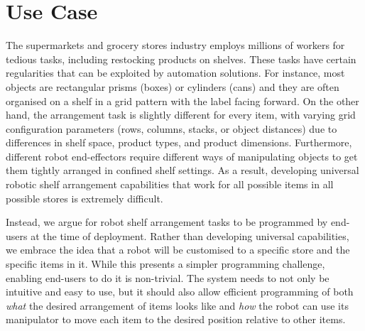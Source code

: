 \section{Use Case}\label{sec:irosintro}
The supermarkets and grocery stores industry employs millions of workers for tedious tasks, including restocking products on shelves. %
These tasks have certain regularities that can be exploited by automation solutions.
For instance, most objects are rectangular prisms (\eg boxes) or cylinders (\eg cans) and they are often organised on a shelf in a grid pattern with the label facing forward.
On the other hand, the arrangement task is slightly different for every item, with varying grid configuration parameters (rows, columns, stacks, or object distances) due to differences in shelf space, product types, and product dimensions.
Furthermore, different robot end-effectors require different ways of manipulating objects to get them tightly arranged in confined shelf settings.
As a result, developing universal robotic shelf arrangement capabilities that work for all possible items in all possible stores is extremely difficult.

Instead, we argue for robot shelf arrangement tasks to be programmed by end-users at the time of deployment.
Rather than developing universal capabilities, we embrace the idea that a robot will be customised to a specific store and the specific items in it.
While this presents a simpler programming challenge, enabling end-users to do it is non-trivial.
The system needs to not only be intuitive and easy to use, but it should also allow efficient programming of both {\em what} the desired arrangement of items looks like and {\em how} the robot can use its manipulator to move each item to the desired position relative to other items.

